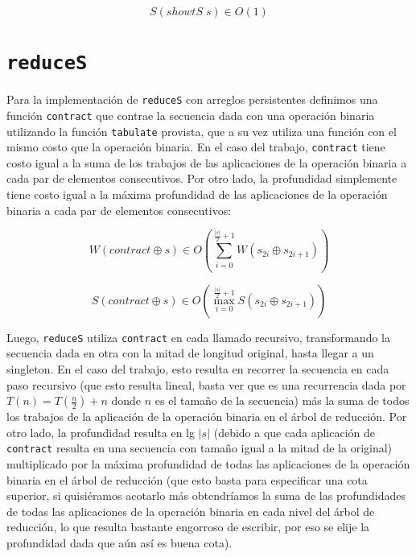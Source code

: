 \documentclass[a4paper,10pt]{article}
\begin{document}
\begin{equation*}
    S \left( showtS \; s \right) \in
    O \left( 1 \right)
\end{equation*}


\section*{\texttt{reduceS}}

Para la implementación de \texttt{reduceS} con arreglos persistentes definimos
una función \texttt{contract} que contrae la secuencia dada con una operación
binaria utilizando la función \texttt{tabulate} provista, que a su vez utiliza
una función con el mismo costo que la operación binaria. En el caso del trabajo,
\texttt{contract} tiene costo igual a la suma de los trabajos de las aplicaciones
de la operación binaria a cada par de elementos consecutivos. Por otro lado,
la profundidad simplemente tiene costo igual a la máxima profundidad de las
aplicaciones de la operación binaria a cada par de elementos consecutivos:

\begin{equation*}
    W \left( contract \oplus s \right) \in
    O \left( \sum_{i=0}^{\frac{\vert s \vert}{2} + 1} W \left( s_{2i} \oplus s_{2i+1} \right) \right)
\end{equation*}

\begin{equation*}
    S \left( contract \oplus s \right) \in
    O \left( \max_{i=0}^{\frac{\vert s \vert}{2} + 1} S \left( s_{2i} \oplus s_{2i+1} \right) \right)
\end{equation*}

Luego, \texttt{reduceS} utiliza \texttt{contract} en cada llamado recursivo,
transformando la secuencia dada en otra con la mitad de longitud original, hasta
llegar a un singleton. En el caso del trabajo, esto resulta en recorrer la secuencia
en cada paso recursivo (que esto resulta lineal, basta ver que es una recurrencia
dada por $T \left( n \right) = T \left( \frac{n}{2} \right) + n$ donde $n$ es el
tamaño de la secuencia) más la suma de todos los trabajos de la aplicación de la
operación binaria en el árbol de reducción. Por otro lado, la profundidad resulta
en lg $\vert s \vert$ (debido a que cada aplicación de \texttt{contract} resulta
en una secuencia con tamaño igual a la mitad de la original) multiplicado por la
máxima profundidad de todas las aplicaciones de la operación binaria en el árbol
de reducción (que esto basta para especificar una cota superior, si quisiéramos
acotarlo más obtendríamos la suma de las profundidades de todas las aplicaciones
de la operación binaria en cada nivel del árbol de reducción, lo que resulta
bastante engorroso de escribir, por eso se elije la profundidad dada que aún así
es buena cota).
\end{document}
